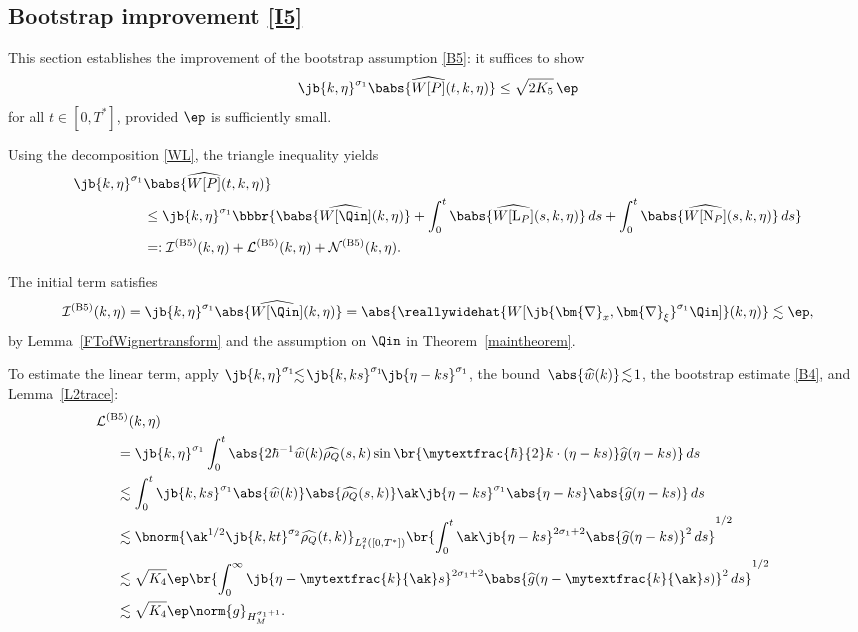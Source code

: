 \subsection{Bootstrap improvement \eqref{I5}}\label{sectionb5}
This section establishes the improvement of the bootstrap assumption \eqref{B5}: it suffices to show
\begin{align*}
\jb{k,\eta}^{\sigma_1}\babs{\widehat{W[P]}(t,k,\eta)}\leq\sqrt{2K_5}\,\ep
\end{align*}
for all $t\in[0,T^*]$, provided $\ep$ is sufficiently small.

Using the decomposition \eqref{WL}, the triangle inequality yields
\begin{align*}
\jb{k,\eta}^{\sigma_1}&\babs{\widehat{W[P]}(t,k,\eta)}\\
&\leq\jb{k,\eta}^{\sigma_1}\bbbr{\babs{\widehat{W[\Qin]}(k,\eta)}+\int_0^t\babs{\widehat{W[{\mathrm{L}_P}]}(s,k,\eta)}\,ds+\int_0^t\babs{\widehat{W[{\mathrm{N}_P}]}(s,k,\eta)}\,ds}\\
&=:\mathcal{I}^{\mathrm{(B5)}}(k,\eta)+\mathcal{L}^{\mathrm{(B5)}}(k,\eta)+\mathcal{N}^{\mathrm{(B5)}}(k,\eta).
\end{align*}

The initial term satisfies
\begin{align*}
\mathcal{I}^{\mathrm{(B5)}}(k,\eta) = \jb{k,\eta}^{\sigma_1}\abs{\widehat{W[\Qin]}(k,\eta)} = \abs{\reallywidehat{W[\jb{\bm{\nabla}_x,\bm{\nabla}_\xi}^{\sigma_1}\Qin]}(k,\eta)} \lesssim \ep,
\end{align*}
by Lemma~\ref{FTofWignertransform} and the assumption on $\Qin$ in Theorem~\ref{maintheorem}.

To estimate the linear term, apply $\jb{k,\eta}^{\sigma_1} \!\!\lesssim\! \jb{k,ks}^{\sigma_1}\! \jb{\eta-ks}^{\sigma_1}$, the bound~\hbox{$\abs{\widehat{w}(k)} \!\lesssim\! 1$}, the bootstrap estimate \eqref{B4}, and Lemma~\ref{L2trace}:
\begin{align*}
&\hspace{-0.25cm}\mathcal{L}^{\mathrm{(B5)}}(k,\eta)\\
&\hspace{0.25cm}=\jb{k,\eta}^{\sigma_1}\int_0^t\abs{2\hbar^{-1}\widehat w(k)\widehat{\rho_Q}(s,k)\sin\br{\mytextfrac{\hbar}{2}k\cdot(\eta-ks)}\widehat g(\eta-ks)}\,ds\\
&\hspace{0.25cm}\lesssim\int_0^t\jb{k,ks}^{\sigma_1}\abs{\widehat w(k)}\abs{\widehat{\rho_Q}(s,k)}\ak\jb{\eta-ks}^{\sigma_1}\abs{\eta-ks}\abs{\widehat g(\eta-ks)}\,ds\\
&\hspace{0.25cm}\lesssim\bnorm{\ak^{1/2}\jb{k,kt}^{\sigma_2}\widehat{\rho_Q}(t,k)}_{L^2_t([0,T^*])}\br{\int_0^t\ak\jb{\eta-ks}^{2\sigma_1+2}\abs{\widehat g(\eta-ks)}^2\,ds}^{1/2}\\
&\hspace{0.25cm}\lesssim\sqrt{K_4}\ep\br{\int_0^\infty\jb{\eta-\mytextfrac{k}{\ak}s}^{2\sigma_1+2}\babs{\widehat g(\eta-\mytextfrac{k}{\ak}s)}^2\,ds}^{1/2}\\
&\hspace{0.25cm}\lesssim\sqrt{K_4}\ep\norm{g}_{H_{M}^{\sigma_1+1}}.
\end{align*}

